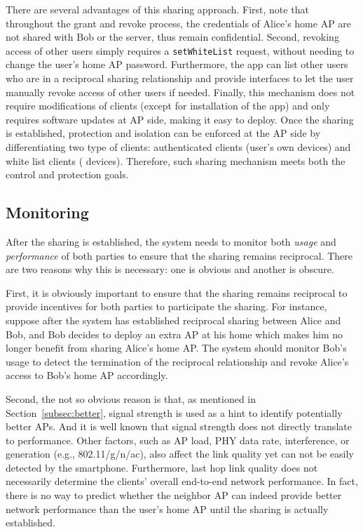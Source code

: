 There are several advantages of this sharing approach. First, note that
throughout the grant and revoke process, the \wifi{} credentials of Alice's home
AP are not shared with Bob or the \wisefi{} server, thus remain confidential.
Second, revoking access of other \wisefi{} users simply requires a
\texttt{setWhiteList} request, without needing to change the user's home AP
password. Furthermore, the \wisefi{} app can list other \wisefi{}
users who are in a reciprocal sharing relationship and provide interfaces to let
the
user manually revoke access of other users if needed. Finally, this mechanism
does not require modifications of \wifi{} clients (except for installation of
the \wisefi{} app) and only requires software updates at AP side, making it easy to
deploy.  Once the sharing is established, protection and isolation can be
enforced at the AP side by differentiating two type of clients: authenticated
clients (user's own devices) and white list clients (\wisefi{} devices).
Therefore, such sharing mechanism meets both the control and protection goals.


\subsection{Monitoring}
\label{subsec:monitoring}

After the sharing is established, the system needs to monitor both \wifi{}
\textit{usage} and \textit{performance} of both parties to ensure that the
sharing remains reciprocal.  There are two reasons why this is necessary: one is
obvious and another is obscure.

First, it is obviously important to ensure that the sharing remains reciprocal
to provide incentives for both parties to participate the sharing.
For instance, suppose after the system has established reciprocal \wifi{} sharing
between Alice and Bob, and Bob decides to deploy an extra AP at his home which
makes him no longer benefit from sharing Alice's home AP. The system should
monitor Bob's \wifi{} usage to detect the termination of the reciprocal
relationship and revoke Alice's access to Bob's home AP accordingly.

Second, the not so obvious reason is that, as mentioned in
Section~\ref{subsec:better}, \wifi{} signal strength is used as a hint to
identify potentially better APs. And it is well known that signal strength does
not directly translate to \wifi{} performance. Other factors, such as AP load,
PHY data rate, interference, or \wifi{} generation (e.g., 802.11/g/n/ac), also affect the link quality
yet can not be easily detected by the smartphone. Furthermore, last hop \wifi{}
link quality does not necessarily determine the clients' overall end-to-end network
performance. In fact, there is no way to predict whether the neighbor AP can
indeed provide better network performance than the user's home AP until the sharing is
actually established.

